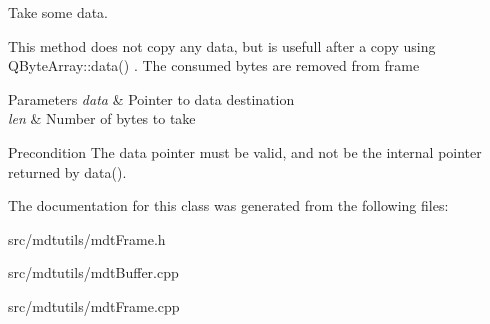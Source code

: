 Take some data. 

This method does not copy any data, but is usefull after a copy using QByteArray::data() . The consumed bytes are removed from frame 
\begin{DoxyParams}{Parameters}
{\em data} & Pointer to data destination \\
\hline
{\em len} & Number of bytes to take \\
\hline
\end{DoxyParams}
\begin{DoxyPrecond}{Precondition}
The data pointer must be valid, and not be the internal pointer returned by data(). 
\end{DoxyPrecond}


The documentation for this class was generated from the following files:\begin{DoxyCompactItemize}
\item 
src/mdtutils/mdtFrame.h\item 
src/mdtutils/mdtBuffer.cpp\item 
src/mdtutils/mdtFrame.cpp\end{DoxyCompactItemize}
